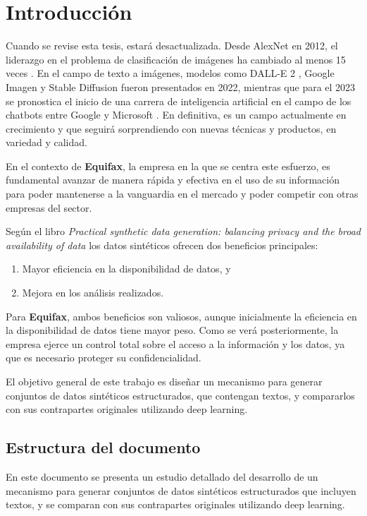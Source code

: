 \chapter{Introducción}
Cuando se revise esta tesis, estará desactualizada. Desde AlexNet \cite{krizhevsky_imagenet_2012} en 2012, el liderazgo en el problema de clasificación de imágenes ha cambiado al menos 15 veces \cite{noauthor_papers_nodate}. En el campo de texto a imágenes, modelos como DALL-E 2 \cite{noauthor_dalle_nodate}, Google Imagen \cite{noauthor_imagen_nodate} y Stable Diffusion \cite{noauthor_stable_nodate} fueron presentados en 2022, mientras que para el 2023 se pronostica el inicio de una carrera de inteligencia artificial en el campo de los chatbots entre Google y Microsoft \cite{milmo_google_2023, noauthor_microsoft_2023}. En definitiva, es un campo actualmente en crecimiento y que seguirá sorprendiendo con nuevas técnicas y productos, en variedad y calidad.

En el contexto de \textbf{Equifax}, la empresa en la que se centra este esfuerzo, es fundamental avanzar de manera rápida y efectiva en el uso de su información para poder mantenerse a la vanguardia en el mercado y poder competir con otras empresas del sector.

Según el libro \emph{Practical synthetic data generation: balancing privacy and the broad availability of data} \cite{el_emam_practical_2020} los datos sintéticos ofrecen dos beneficios principales:
\begin{enumerate}
    \item Mayor eficiencia en la disponibilidad de datos, y
    \item Mejora en los análisis realizados.
\end{enumerate}

Para \textbf{Equifax}, ambos beneficios son valiosos, aunque inicialmente la eficiencia en la disponibilidad de datos tiene mayor peso. Como se verá posteriormente, la empresa ejerce un control total sobre el acceso a la información y los datos, ya que es necesario proteger su confidencialidad.

El objetivo general de este trabajo es diseñar un mecanismo para generar conjuntos de datos sintéticos estructurados, que contengan textos, y compararlos con sus contrapartes originales utilizando deep learning.

\section{Estructura del documento}
En este documento se presenta un estudio detallado del desarrollo de un mecanismo para generar conjuntos de datos sintéticos estructurados que incluyen textos, y se comparan con sus contrapartes originales utilizando deep learning.

